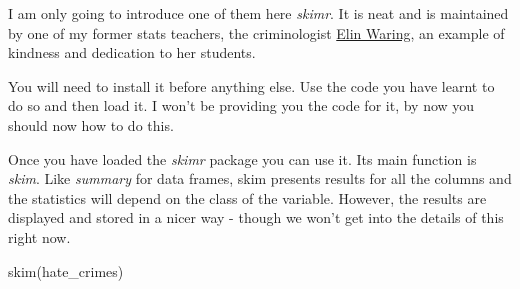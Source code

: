 \documentclass[
]{book}
\newenvironment{Shaded}{\begin{snugshade}}{\end{snugshade}}
\newcommand{\FunctionTok}[1]{\textcolor[rgb]{0.00,0.00,0.00}{#1}}
\newcommand{\NormalTok}[1]{#1}
\begin{document}
I am only going to introduce one of them here \emph{skimr}. It is neat and is maintained by one of my former stats teachers, the criminologist \href{https://www.lehman.edu/academics/sociology/faculty-waring.php}{Elin Waring}, an example of kindness and dedication to her students.

You will need to install it before anything else. Use the code you have learnt to do so and then load it. I won't be providing you the code for it, by now you should now how to do this.

Once you have loaded the \emph{skimr} package you can use it. Its main function is \emph{skim}. Like \emph{summary} for data frames, skim presents results for all the columns and the statistics will depend on the class of the variable. However, the results are displayed and stored in a nicer way - though we won't get into the details of this right now.

\begin{Shaded}
\begin{Highlighting}[]
\FunctionTok{skim}\NormalTok{(hate\_crimes)}
\end{Highlighting}
\end{Shaded}
\end{document}
